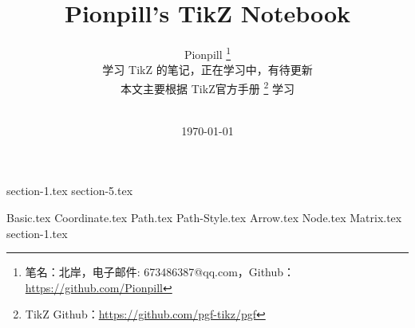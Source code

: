 \documentclass{PionpillNote-book}
\title{Pionpill's TikZ Notebook}
\author{
    Pionpill
    \footnote{笔名：北岸，电子邮件: 673486387@qq.com，Github：\url{https://github.com/Pionpill}}\\[2ex]
    学习 TikZ 的笔记，正在学习中，有待更新 \\
    本文主要根据 TikZ官方手册 \footnote{TikZ Github：\url{https://github.com/pgf-tikz/pgf}}  学习
    
    \\[2ex]
}
\date{\today}
\begin{document}
\maketitle                  %
\tableofcontents            %
\thispagestyle{empty}
\newpage
\setcounter{page}{1}


{section-1.tex}
{section-5.tex}

{Basic.tex}
{Coordinate.tex}
{Path.tex}
{Path-Style.tex}
{Arrow.tex}
{Node.tex}
{Matrix.tex}
{section-1.tex}



\end{document}
